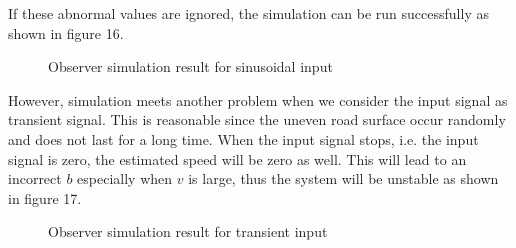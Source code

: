 \documentclass{article}
\begin{document}
If these abnormal values are ignored,
the simulation can be run successfully as shown in figure 16.\\

\begin{figure}[htbp]
    \centering
    \caption{Observer simulation result for sinusoidal input}
\end{figure}

However, simulation meets another problem when we consider the input signal as transient signal.
This is reasonable since the uneven road surface occur randomly and does not last for a long time.
When the input signal stops, i.e. the input signal is zero,
the estimated speed will be zero as well.
This will lead to an incorrect $b$ especially when $v$ is large,
thus the system will be unstable as shown in figure 17.\\

\begin{figure}[htbp]
    \centering
    \caption{Observer simulation result for transient input}
\end{figure}
\end{document}
